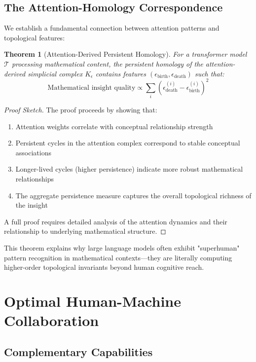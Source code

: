 \documentclass[11pt]{article}
\newtheorem{theorem}{Theorem}[section]
\newcommand{\T}{\mathcal{T}}
\begin{document}
\subsection{The Attention-Homology Correspondence}

We establish a fundamental connection between attention patterns and topological features:

\begin{theorem}[Attention-Derived Persistent Homology]
For a transformer model $\T$ processing mathematical content, the persistent homology of the attention-derived simplicial complex $K_\epsilon$ contains features $(\epsilon_{\text{birth}}, \epsilon_{\text{death}})$ such that:
$$\text{Mathematical insight quality} \propto \sum_i (\epsilon_{\text{death}}^{(i)} - \epsilon_{\text{birth}}^{(i)})^2$$
\end{theorem}

\begin{proof}[Proof Sketch]
The proof proceeds by showing that:
\begin{enumerate}
\item Attention weights correlate with conceptual relationship strength
\item Persistent cycles in the attention complex correspond to stable conceptual associations
\item Longer-lived cycles (higher persistence) indicate more robust mathematical relationships
\item The aggregate persistence measure captures the overall topological richness of the insight
\end{enumerate}
A full proof requires detailed analysis of the attention dynamics and their relationship to underlying mathematical structure.
\end{proof}

This theorem explains why large language models often exhibit "superhuman" pattern recognition in mathematical contexts—they are literally computing higher-order topological invariants beyond human cognitive reach.

\section{Optimal Human-Machine Collaboration}

\subsection{Complementary Capabilities}
\end{document}
